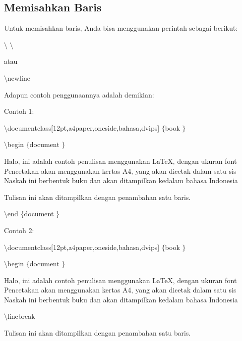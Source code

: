 \subsection{Memisahkan Baris} \par
Untuk memisahkan baris, Anda bisa menggunakan perintah sebagai berikut: \par
 $  \setminus  $ $  \setminus  $ \par
atau \par
{\fontsize{10pt}{10pt}\selectfont  $  \setminus  $newline} \par
\vspace{12pt}
Adapun contoh penggunaannya adalah demikian: \par
Contoh 1: \par
{\fontsize{10pt}{10pt}\selectfont  $  \setminus  $documentclass[12pt,a4paper,oneside,bahasa,dvips] $  \{  $book $  \}  $} \par
{\fontsize{10pt}{10pt}\selectfont  $  \setminus  $begin $  \{  $document $  \}  $} \par
\vspace{10pt}
{\fontsize{10pt}{10pt}\selectfont Halo, ini adalah contoh penulisan menggunakan LaTeX, dengan ukuran font Pencetakan akan menggunakan kertas A4, yang akan dicetak dalam satu sis Naskah ini berbentuk buku dan akan ditampilkan kedalam bahasa Indonesia} \par
\vspace{10pt}
{\fontsize{10pt}{10pt}\selectfont Tulisan ini akan ditampilkan dengan penambahan satu baris.} \par
{\fontsize{10pt}{10pt}\selectfont  $  \setminus  $end $  \{  $document $  \}  $} \par
\vspace{10pt}
Contoh 2: \par
{\fontsize{10pt}{10pt}\selectfont  $  \setminus  $documentclass[12pt,a4paper,oneside,bahasa,dvips] $  \{  $book $  \}  $} \par
{\fontsize{10pt}{10pt}\selectfont  $  \setminus  $begin $  \{  $document $  \}  $} \par
\vspace{10pt}
{\fontsize{10pt}{10pt}\selectfont Halo, ini adalah contoh penulisan menggunakan LaTeX, dengan ukuran font Pencetakan akan menggunakan kertas A4, yang akan dicetak dalam satu sis Naskah ini berbentuk buku dan akan ditampilkan kedalam bahasa Indonesia} \par
\vspace{10pt}
{\fontsize{10pt}{10pt}\selectfont  $  \setminus  $linebreak} \par
{\fontsize{10pt}{10pt}\selectfont Tulisan ini akan ditampilkan dengan penambahan satu baris.} \par

